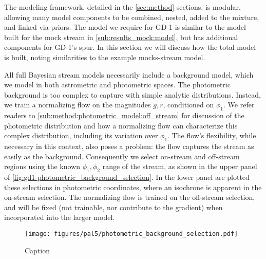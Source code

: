 \documentclass[twocolumn]{aastex631}
\newcommand{\stream}[1]{#1}
\begin{document}

        The modeling framework, detailed in the \autoref{sec:method} sections, is
        modular, allowing many model components to be combined, nested, added
        to the mixture, and linked via priors.
        The model we require for \stream{GD-1} is similar to 
        the model built for the mock stream in \autoref{sub:results_mock:model},
        but has additional components for \stream{GD-1}'s spur.
        In this section we will discuss how the total model is built, noting 
        similarities to the example mocks-stream model.

        All full Bayesian stream models necessarily include a background model,
        which we model in both astrometric and photometric spaces.
        The photometric background is too complex to capture with simple analytic
        distributions. Instead, we train a normalizing flow on the magnitudes $g, r$,
        conditioned on $\phi_1$. We refer readers to
        \autoref{sub:method:photometric_model:off_stream} for discussion of the photometric distribution and how a normalizing flow
        can characterize this complex distribution, including its variation over $\phi_1$.
        The flow's flexibility, while necessary in this context, also poses
        a problem: the flow captures the stream as easily as the background.
        Consequently we select on-stream and off-stream regions using the known
        $\phi_1,\phi_2$ range of the stream, as shown in the
        upper panel of \autoref{fig:gd1-photometric_background_selection}.
        In the lower panel are plotted these selections in photometric coordinates,
        where an isochrone is apparent in the on-stream selection.
        The normalizing flow is trained on the off-stream selection, and will be
        fixed (not trainable, nor contribute to the gradient) when incorporated into the larger model.

        \begin{figure}
            \centering
            \texttt{[image: figures/pal5/photometric\_background\_selection.pdf]}
            \caption{Caption}
            \label{fig:pal5-photometric_background_selection}
        \end{figure}
\end{document}
